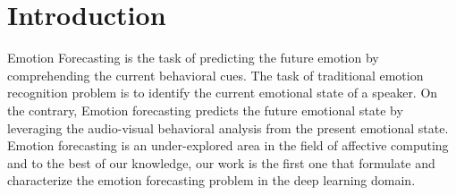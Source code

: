 
\chapter{Introduction} %

\label{Chapter1} %


\newcommand{\keyword}[1]{\textbf{#1}}
\newcommand{\tabhead}[1]{\textbf{#1}}
\newcommand{\code}[1]{\texttt{#1}}
\newcommand{\file}[1]{\texttt{\bfseries#1}}
\newcommand{\option}[1]{\texttt{\itshape#1}}





Emotion Forecasting is the task of predicting the future emotion by comprehending the current behavioral cues. The task of traditional emotion recognition problem is to identify the current emotional state of a speaker. On the contrary, Emotion forecasting predicts the future emotional state by leveraging the audio-visual behavioral analysis from the present emotional state. Emotion forecasting is an under-explored area in the field of affective computing and to the best of our knowledge, our work is the first one that formulate and characterize the emotion forecasting problem in the deep learning domain. 

